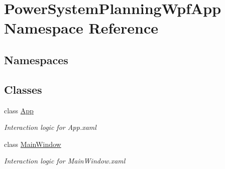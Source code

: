 \hypertarget{namespace_power_system_planning_wpf_app}{}\section{Power\+System\+Planning\+Wpf\+App Namespace Reference}
\label{namespace_power_system_planning_wpf_app}
\subsection*{Namespaces}
\begin{DoxyCompactItemize}
\end{DoxyCompactItemize}
\subsection*{Classes}
\begin{DoxyCompactItemize}
\item 
class \hyperlink{class_power_system_planning_wpf_app_1_1_app}{App}
\begin{DoxyCompactList}\small\item\em Interaction logic for App.\+xaml \end{DoxyCompactList}\item 
class \hyperlink{class_power_system_planning_wpf_app_1_1_main_window}{Main\+Window}
\begin{DoxyCompactList}\small\item\em Interaction logic for Main\+Window.\+xaml \end{DoxyCompactList}\end{DoxyCompactItemize}
